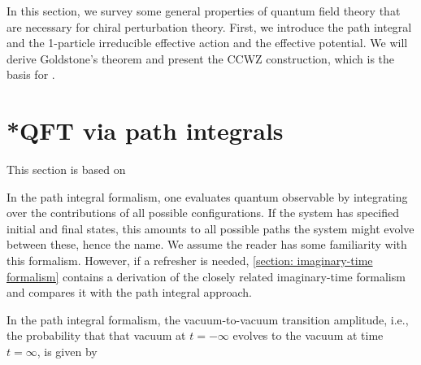 In this section, we survey some general properties of quantum field theory that are necessary for chiral perturbation theory.
First, we introduce the path integral and the 1-particle irreducible effective action and the effective potential.
We will derive Goldstone's theorem and present the CCWZ construction, which is the basis for \chpt.

\section{*QFT via path integrals}
\label{section: path integral}

This section is based on \autocite{peskinIntroductionQuantumField1995,weinbergQuantumTheoryFields1995,weinbergQuantumTheoryFields1996,schwartzQuantumFieldTheory2013}

In the path integral formalism, one evaluates quantum observable by integrating over the contributions of all possible configurations.
If the system has specified initial and final states, this amounts to all possible paths the system might evolve between these, hence the name.
We assume the reader has some familiarity with this formalism. 
However, if a refresher is needed, \autoref{section: imaginary-time formalism} contains a derivation of the closely related imaginary-time formalism and compares it with the path integral approach.

In the path integral formalism, the vacuum-to-vacuum transition amplitude, i.e., the probability that that vacuum at $t = -\infty$ evolves to the vacuum at time $t = \infty$, is given by

